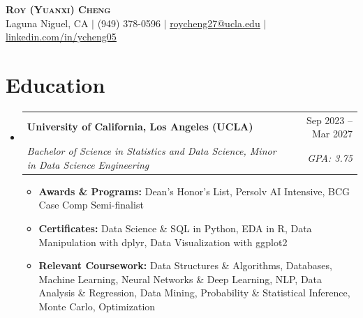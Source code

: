 \documentclass[letterpaper,11pt]{article}
\makeatletter
\newcommand{\resumeItem}[1]{
  \item\small{#1}
}
\newcommand{\resumeSubheading}[4]{
  \vspace{-2pt}\item
    \begin{tabular*}{\textwidth}[t]{l@{\extracolsep{\fill}}r}
      \textbf{#1} & #2 \\
      \textit{\small#3} & \textit{\small #4} \\
    \end{tabular*}\vspace{-7pt}
}
\newcommand{\resumeSubHeadingListStart}{\begin{itemize}[leftmargin=0in, label={}]}
\newcommand{\resumeSubHeadingListEnd}{\end{itemize}}
\newcommand{\resumeItemListStart}{\begin{itemize}[itemsep= 1.5pt, parsep=0pt]}
\newcommand{\resumeItemListEnd}{\end{itemize}\vspace{-5pt}}
\makeatother
\begin{document}
\begin{center}
    \textbf{\LARGE \scshape Roy (Yuanxi) Cheng} \\ \vspace{3pt}
    \small Laguna Niguel, CA $|$ (949) 378-0596 $|$
    \href{mailto:roycheng27@ucla.edu}{\underline{roycheng27@ucla.edu}} $|$
    \href{https://www.linkedin.com/in/ycheng05}{\underline{linkedin.com/in/ycheng05}}
\end{center}
\section{Education}
  \resumeSubHeadingListStart
    \resumeSubheading
      {University of California, Los Angeles (UCLA)}{Sep 2023 -- Mar 2027}
      {Bachelor of Science in Statistics and Data Science, Minor in Data Science Engineering}{GPA: 3.75}
      \resumeItemListStart
        \resumeItem{\textbf{Awards \& Programs:} Dean's Honor's List, Persolv AI Intensive, BCG Case Comp Semi-finalist}
        \resumeItem{\textbf{Certificates:} Data Science \& SQL in Python, EDA in R, Data Manipulation with dplyr, Data Visualization with ggplot2}
        \resumeItem{\textbf{Relevant Coursework:} Data Structures \& Algorithms, Databases, Machine Learning, Neural Networks \& Deep Learning, NLP, Data Analysis \& Regression, Data Mining, Probability \& Statistical Inference, Monte Carlo, Optimization}
      \resumeItemListEnd
  \resumeSubHeadingListEnd
\end{document}
